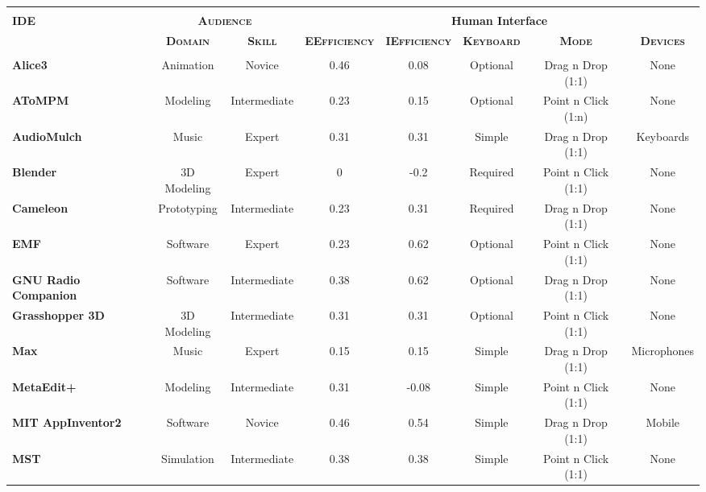 \begin{table*}
	\centering
		{\scriptsize
		\begin{tabular}{l|cc|ccccc}
		  \hline\hline
		  &&&&&&&		\\[-1.5ex]
      \multirow{2}{*}{\textbf{IDE}}
      & \multicolumn{2}{c|}{\textbf{\scshape Audience}}
      & \multicolumn{5}{c}{\textbf{Human Interface}}  \\[1ex]
      & \textbf{\scshape Domain}
      & \textbf{\scshape Skill}
      & \textbf{\scshape EEfficiency}
      & \textbf{\scshape IEfficiency}
      & \textbf{\scshape Keyboard}
      & \textbf{\scshape Mode}
      & \textbf{\scshape Devices}			\\[1ex]
		  \hline
		  &&&&&&&		\\[-1.5ex]
      \textbf{Alice3}    & Animation	& Novice	& 0.46	& 0.08	& Optional	& Drag n Drop (1:1)	& None			\\[1ex]
      \textbf{AToMPM}    & Modeling	& Intermediate	& 0.23	& 0.15	& Optional	& Point n Click (1:n)	& None			\\[1ex]
      \textbf{AudioMulch}    & Music	& Expert	& 0.31	& 0.31	& Simple	& Drag n Drop (1:1)	& Keyboards			\\[1ex]
      \textbf{Blender}    & 3D Modeling	& Expert	& 0	& -0.2	& Required	& Point n Click (1:1)	& None			\\[1ex]
      \textbf{Cameleon}    & Prototyping	& Intermediate	& 0.23	& 0.31	& Required	& Drag n Drop (1:1)	& None			\\[1ex]
      \textbf{EMF}    & Software	& Expert	& 0.23	& 0.62	& Optional	& Point n Click (1:1)	& None			\\[1ex]
      \textbf{GNU Radio Companion}    & Software	& Intermediate	& 0.38	& 0.62	& Optional	& Drag n Drop (1:1)	& None			\\[1ex]
      \textbf{Grasshopper 3D}    & 3D Modeling	& Intermediate	& 0.31	& 0.31	& Optional	& Point n Click (1:1)	& None			\\[1ex]
      \textbf{Max}    & Music	& Expert	& 0.15	& 0.15	& Simple	& Drag n Drop (1:1)	& Microphones			\\[1ex]
      \textbf{MetaEdit+}    & Modeling	& Intermediate	& 0.31	& -0.08	& Simple	& Point n Click (1:1)	& None			\\[1ex]
      \textbf{MIT AppInventor2}    & Software	& Novice	& 0.46	& 0.54	& Simple	& Drag n Drop (1:1)	& Mobile			\\[1ex]
      \textbf{MST}    & Simulation	& Intermediate	& 0.38	& 0.38	& Simple	& Point n Click (1:1)	& None			\\[1ex]

\end{tabular}}
\end{table*}
